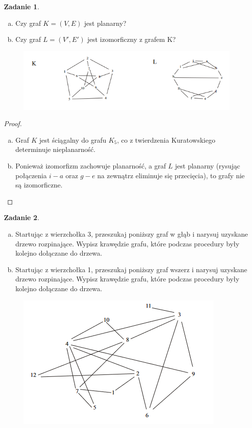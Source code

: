 \documentclass[11pt]{article}
\theoremstyle{definition}
\newtheorem{zadanie}{Zadanie}
\begin{document}
\newpage
\begin{zadanie}
    \begin{enumerate}[a)]
        \item Czy graf $K= (V,E)$ jest planarny?
        \item Czy graf $L= (V',E')$ jest izomorficzny z grafem K?
    \end{enumerate}
    \begin{figure}[H]
        \centering
        \includegraphics[width=0.8\linewidth]{./data/kol-1-11.png}
    \end{figure}

\end{zadanie}
\begin{proof}
\begin{enumerate}[a)]
\item Graf $K$ jest ściągalny do grafu $K_5$, co z twierdzenia Kuratowskiego determinuje nieplanarność.
\item Ponieważ izomorfizm zachowuje planarność, a graf $L$ jest planarny (rysując połączenia $i-a$ oraz $g-e$ na zewnątrz eliminuje się przecięcia), to grafy nie są izomorficzne.
\end{enumerate}
\end{proof}
\begin{zadanie}

    \begin{enumerate}[a)]
        \item Startując z wierzchołka 3, przeszukaj poniższy graf w głąb i narysuj uzyskane drzewo rozpinające. Wypisz krawędzie grafu, które podczas procedury były kolejno dołączane do drzewa.
        \item Startując z wierzchołka 1, przeszukaj poniższy graf wszerz i narysuj uzyskane drzewo rozpinające. Wypisz krawędzie grafu, które podczas procedury były kolejno dołączane do drzewa.
    \end{enumerate}
    \begin{figure}[H]
        \centering
        \includegraphics[width=0.5\linewidth]{./data/kol-1-12.png}
    \end{figure}
\end{zadanie}
\end{document}

